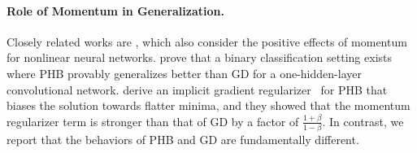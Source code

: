 \paragraph{Role of Momentum in Generalization.}
Closely related works are \citet{ghosh2023implicit,jelassi2022momentum}, which also consider the positive effects of momentum for nonlinear neural networks.
\citet{jelassi2022momentum} prove that a binary classification setting exists where PHB provably generalizes better than GD for a one-hidden-layer convolutional network.
\citet{ghosh2023implicit} derive an implicit gradient regularizer~\cite{barrett2021implicit} for PHB that biases the solution towards flatter minima, and they showed that the momentum regularizer term is stronger than that of GD by a factor of $\frac{1+\beta}{1 - \beta}$.
In contrast, we report that the behaviors of PHB and GD are fundamentally different.